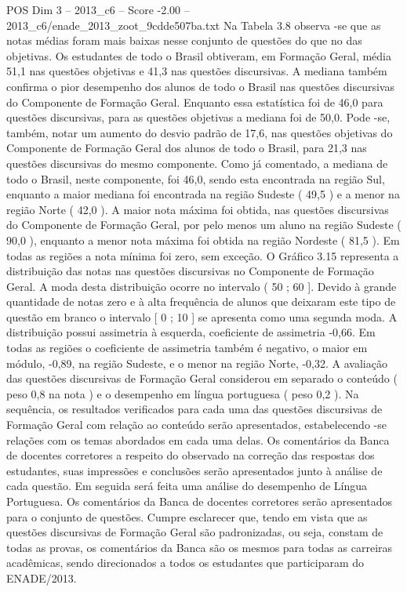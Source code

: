 \begin{textsample}{POS Dim 3 – 2013\_c6 – Score -2.00 – 2013\_c6/enade\_2013\_zoot\_9cdde507ba.txt}
Na Tabela 3.8 observa -se que as notas médias foram mais baixas nesse conjunto de questões do que no das objetivas.
Os estudantes de todo o Brasil obtiveram, em Formação Geral, média 51,1 nas questões objetivas e 41,3 nas questões discursivas.
A mediana também confirma o pior desempenho dos alunos de todo o Brasil nas questões discursivas do Componente de Formação Geral.
Enquanto essa estatística foi de 46,0 para questões discursivas, para as questões objetivas a mediana foi de 50,0.
Pode -se, também, notar um aumento do desvio padrão de 17,6, nas questões objetivas do Componente de Formação Geral dos alunos de todo o Brasil, para 21,3 nas questões discursivas do mesmo componente.
Como já comentado, a mediana de todo o Brasil, neste componente, foi 46,0, sendo esta encontrada na região Sul, enquanto a maior mediana foi encontrada na região Sudeste ( 49,5 ) e a menor na região Norte ( 42,0 ).
A maior nota máxima foi obtida, nas questões discursivas do Componente de Formação Geral, por pelo menos um aluno na região Sudeste ( 90,0 ), enquanto a menor nota máxima foi obtida na região Nordeste ( 81,5 ).
Em todas as regiões a nota mínima foi zero, sem exceção.
O Gráfico 3.15 representa a distribuição das notas nas questões discursivas no Componente de Formação Geral.
A moda desta distribuição ocorre no intervalo ( 50 ; 60 ].
Devido à grande quantidade de notas zero e à alta frequência de alunos que deixaram este tipo de questão em branco o intervalo [ 0 ; 10 ] se apresenta como uma segunda moda.
A distribuição possui assimetria à esquerda, coeficiente de assimetria -0,66.
Em todas as regiões o coeficiente de assimetria também é negativo, o maior em módulo, -0,89, na região Sudeste, e o menor na região Norte, -0,32.
A avaliação das questões discursivas de Formação Geral considerou em separado o conteúdo ( peso 0,8 na nota ) e o desempenho em língua portuguesa ( peso 0,2 ).
Na sequência, os resultados verificados para cada uma das questões discursivas de Formação Geral com relação ao conteúdo serão apresentados, estabelecendo -se relações com os temas abordados em cada uma delas.
Os comentários da Banca de docentes corretores a respeito do observado na correção das respostas dos estudantes, suas impressões e conclusões serão apresentados junto à análise de cada questão.
Em seguida será feita uma análise do desempenho de Língua Portuguesa.
Os comentários da Banca de docentes corretores serão apresentados para o conjunto de questões.
Cumpre esclarecer que, tendo em vista que as questões discursivas de Formação Geral são padronizadas, ou seja, constam de todas as provas, os comentários da Banca são os mesmos para todas as carreiras acadêmicas, sendo direcionados a todos os estudantes que participaram do ENADE/2013.

\end{textsample}
